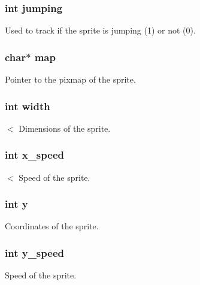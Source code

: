 \subsubsection[{jumping}]{\setlength{\rightskip}{0pt plus 5cm}int jumping}\label{group__sprite_gad427edc16087f64ef18fb771dd34cc0b}
Used to track if the sprite is jumping (1) or not (0). \hypertarget{group__sprite_ga7b00b1bfd666e26484471bd17a74eaa9}{}
\subsubsection[{map}]{\setlength{\rightskip}{0pt plus 5cm}char$\ast$ map}\label{group__sprite_ga7b00b1bfd666e26484471bd17a74eaa9}
Pointer to the pixmap of the sprite. \hypertarget{group__sprite_ga2474a5474cbff19523a51eb1de01cda4}{}
\subsubsection[{width}]{\setlength{\rightskip}{0pt plus 5cm}int width}\label{group__sprite_ga2474a5474cbff19523a51eb1de01cda4}
$<$ Dimensions of the sprite. \hypertarget{group__sprite_ga56d83ad8a1afb318706057c1ec72f797}{}
\subsubsection[{x\+\_\+speed}]{\setlength{\rightskip}{0pt plus 5cm}int x\+\_\+speed}\label{group__sprite_ga56d83ad8a1afb318706057c1ec72f797}
$<$ Speed of the sprite. \hypertarget{group__sprite_ga0a2f84ed7838f07779ae24c5a9086d33}{}
\subsubsection[{y}]{\setlength{\rightskip}{0pt plus 5cm}int y}\label{group__sprite_ga0a2f84ed7838f07779ae24c5a9086d33}
Coordinates of the sprite. \hypertarget{group__sprite_ga081c2d7f9619a32bd806baa1831ce1c1}{}
\subsubsection[{y\+\_\+speed}]{\setlength{\rightskip}{0pt plus 5cm}int y\+\_\+speed}\label{group__sprite_ga081c2d7f9619a32bd806baa1831ce1c1}
Speed of the sprite. 